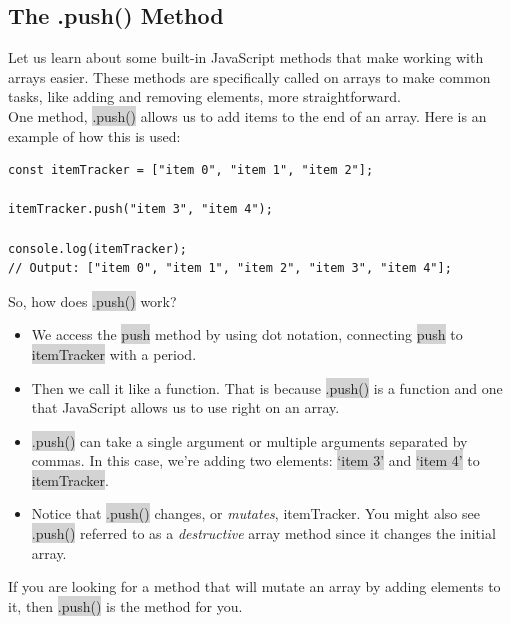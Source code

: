 \documentclass[11pt]{article}
\begin{document}
\subsection{The .push() Method}
Let us learn about some built-in JavaScript methods that make working with arrays easier. These methods are specifically called on arrays to make common tasks, like adding and removing elements, more straightforward. \\
\newline
One method, \colorbox{lightgray}{.push()} allows us to add items to the end of an array. Here is an example of how this is used:
\begin{lstlisting}
const itemTracker = ["item 0", "item 1", "item 2"];

itemTracker.push("item 3", "item 4");

console.log(itemTracker); 
// Output: ["item 0", "item 1", "item 2", "item 3", "item 4"];
\end{lstlisting}
So, how does \colorbox{lightgray}{.push()} work?
\begin{itemize}[leftmargin = *]
\item We access the \colorbox{lightgray}{push} method by using dot notation, connecting \colorbox{lightgray}{push} to \colorbox{lightgray}{itemTracker} with a period.
\item Then we call it like a function. That is because \colorbox{lightgray}{.push()} is a function and one that JavaScript allows us to use right on an array.
\item \colorbox{lightgray}{.push()} can take a single argument or multiple arguments separated by commas. In this case, we’re adding two elements: \colorbox{lightgray}{`item 3'} and \colorbox{lightgray}{`item 4'} to \colorbox{lightgray}{itemTracker}.
\item Notice that \colorbox{lightgray}{.push()} changes, or \textit{mutates}, itemTracker. You might also see \colorbox{lightgray}{.push()} referred to as a \textit{destructive} array method since it changes the initial array.
\end{itemize}
If you are looking for a method that will mutate an array by adding elements to it, then \colorbox{lightgray}{.push()} is the method for you. 
\end{document}
